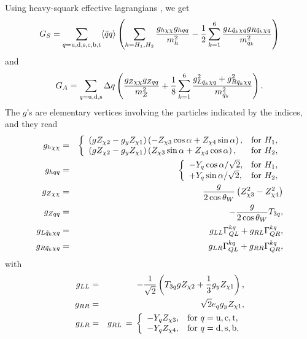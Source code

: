 \documentclass[a4paper,10pt,oneside]{book}
\begin{document}
Using heavy-squark effective lagrangians
\cite{Griest:1988ma,Barbieri:1988zs,Gelmini:1990je,Kamionkowski:1991nj,Bottino:1993aa}, we get
\begin{equation}
   G_S = \sum_{q={\rm u,d,s,c,b,t}} \langle \bar{q} q \rangle
   \left( \sum_{h=H_1,H_2} { g_{h\chi\chi} g_{hqq} \over m_h^2 } -
   {1\over 2} \sum_{k=1}^6 { g_{L\tilde{q}_k\chi q} g_{R\tilde{q}_k\chi q} \over
   m^2_{\tilde{q}_k} } \right)
\label{GS}
\end{equation}
and
\begin{equation}
   G_A = \sum_{q={\rm u,d,s}} \Delta q
    \left( { g_{Z\chi\chi} g_{Zqq} \over m_Z^2 } + {1\over 8} \sum_{k=1}^6
   { g_{L\tilde{q}_k\chi q}^2 + g_{R\tilde{q}_k\chi q}^2 \over m^2_{\tilde{q}_k}
   } \right) .
\label{GA}
\end{equation}
The $g$'s are elementary vertices involving the particles indicated by
the indices, and they read
\begin{eqnarray}
   g_{h\chi\chi} & = & \left\{  \begin{array}{ll}
   \left( g Z_{\chi2} - g_y Z_{\chi1} \right)
   \left( - Z_{\chi3} \cos\alpha + Z_{\chi4} \sin\alpha \right) ,
   & {\rm for\ } H_1 , \\
   \left( g Z_{\chi2} - g_y Z_{\chi1} \right)
   \left( Z_{\chi3} \sin\alpha + Z_{\chi4} \cos\alpha \right) ,
   & {\rm for\ } H_2 ,
   \end{array} \right. \\
   g_{hqq} & = & \left\{ \begin{array}{ll}
   - Y_q \cos\alpha / \sqrt{2} , & {\rm for\ } H_1 , \\
   + Y_q \sin\alpha / \sqrt{2} , & {\rm for\ } H_2 , \end{array} \right. \\
   g_{Z\chi\chi} & = & {g \over 2 \cos\theta_W}
   \left( Z_{\chi3}^2 - Z_{\chi4}^2 \right)\\
   g_{Zqq} & = & - {g \over 2 \cos\theta_W} T_{3q} , \\
   g_{L\tilde{q}_k\chi q} & = & g_{LL} \Gamma_{QL}^{kq} +
   g_{RL} \Gamma_{QR}^{kq} , \\
   g_{R\tilde{q}_k\chi q} & = & g_{LR} \Gamma_{QL}^{kq} +
   g_{RR} \Gamma_{QR}^{kq} ,
\end{eqnarray}
with
\begin{eqnarray}
   g_{LL} & = & - {1\over\sqrt{2}}
   \left( T_{3q} g Z_{\chi2} + {1\over3} g_y Z_{\chi1} \right) , \\
   g_{RR} & = & \sqrt{2} e_q g_y Z_{\chi1} , \\
   g_{LR} & = & g_{RL} \, = \, \left\{ \begin{array}{ll}
   - Y_q Z_{\chi3} , & {\rm for\ } q={\rm u,c,t} , \\
   - Y_q Z_{\chi4} , & {\rm for\ } q={\rm d,s,b} ,
   \end{array} \right.
\end{eqnarray}
\end{document}
